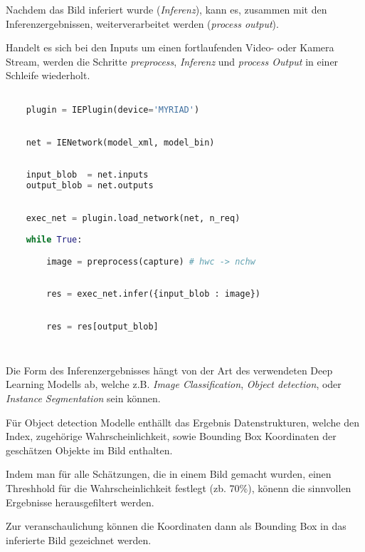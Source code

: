 Nachdem das Bild inferiert wurde (\textit{Inferenz}),
kann es, zusammen mit den Inferenzergebnissen, 
weiterverarbeitet werden (\textit{process
output}).

Handelt es sich bei den Inputs 
um einen fortlaufenden Video- oder 
Kamera Stream, werden die Schritte 
\textit{preprocess}, \textit{Inferenz} und 
\textit{process Output} in einer Schleife wiederholt.


\vspace{1cm}
\begin{minipage}{0.30\textwidth}
    \centering
    
    \label{fig:inger_engine_workflow}
\end{minipage}
\begin{minipage}{0.70\textwidth}

\begin{lstlisting}[language=Python]

    plugin = IEPlugin(device='MYRIAD')

        
    net = IENetwork(model_xml, model_bin)
        
    
    input_blob  = net.inputs
    output_blob = net.outputs
        

    exec_net = plugin.load_network(net, n_req)
        
    while True:

        image = preprocess(capture) # hwc -> nchw
        
        
        res = exec_net.infer({input_blob : image})
        

        res = res[output_blob]
        
        
\end{lstlisting}
\vspace{1.5cm}
\end{minipage}
\vspace{1cm}


Die Form des Inferenzergebnisses hängt von der 
Art des verwendeten Deep Learning Modells ab, welche 
z.B. \textit{Image Classification}, \textit{Object detection},
oder \textit{Instance
Segmentation} sein können.

Für Object detection Modelle enthällt das Ergebnis
 Datenstrukturen, welche den Index, 
 zugehörige Wahrscheinlichkeit, sowie Bounding 
 Box Koordinaten der geschätzen Objekte im Bild enthalten.

Indem man für alle Schätzungen, die in einem Bild gemacht wurden, 
einen Threshhold für die Wahrscheinlichkeit festlegt (zb. 70\%),
könenn die sinnvollen Ergebnisse herausgefiltert werden.

Zur veranschaulichung können die Koordinaten dann 
als Bounding Box in das inferierte Bild gezeichnet werden.
